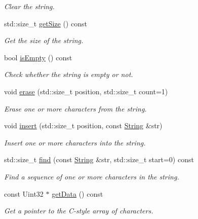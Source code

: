 \begin{DoxyCompactItemize}
\begin{DoxyCompactList}\small\item\em Clear the string. \end{DoxyCompactList}\item 
std\+::size\+\_\+t \hyperlink{classsf_1_1_string_a635d75c4cd830d5f639a41815dd0ce23}{get\+Size} () const 
\begin{DoxyCompactList}\small\item\em Get the size of the string. \end{DoxyCompactList}\item 
bool \hyperlink{classsf_1_1_string_a6c43f0cbe84cf17fa6ba93d58b75fcdc}{is\+Empty} () const 
\begin{DoxyCompactList}\small\item\em Check whether the string is empty or not. \end{DoxyCompactList}\item 
void \hyperlink{classsf_1_1_string_aaa78a0a46b3fbe200a4ccdedc326eb93}{erase} (std\+::size\+\_\+t position, std\+::size\+\_\+t count=1)
\begin{DoxyCompactList}\small\item\em Erase one or more characters from the string. \end{DoxyCompactList}\item 
void \hyperlink{classsf_1_1_string_ad0b1455deabf07af13ee79812e05fa02}{insert} (std\+::size\+\_\+t position, const \hyperlink{classsf_1_1_string}{String} \&str)
\begin{DoxyCompactList}\small\item\em Insert one or more characters into the string. \end{DoxyCompactList}\item 
std\+::size\+\_\+t \hyperlink{classsf_1_1_string_ae1fc8d6ced3b6082853f8013ea051b5c}{find} (const \hyperlink{classsf_1_1_string}{String} \&str, std\+::size\+\_\+t start=0) const 
\begin{DoxyCompactList}\small\item\em Find a sequence of one or more characters in the string. \end{DoxyCompactList}\item 
const Uint32 $\ast$ \hyperlink{classsf_1_1_string_af2d4e70869ebd38e225c6796e1325ae4}{get\+Data} () const 
\begin{DoxyCompactList}\small\item\em Get a pointer to the C-\/style array of characters. \end{DoxyCompactList}\item 

\end{DoxyCompactItemize}
